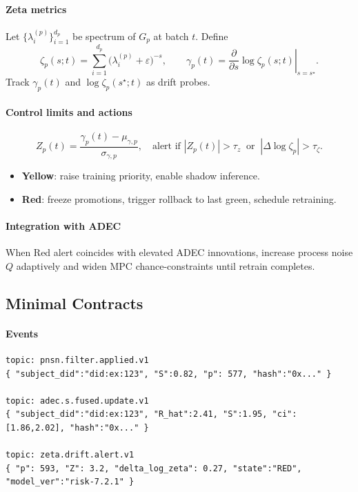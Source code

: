 \documentclass[11pt]{article}
\theoremstyle{plain}
\begin{document}
\paragraph{Zeta metrics}
Let $\{\lambda^{(p)}_i\}_{i=1}^{d_p}$ be spectrum of $G_p$ at batch $t$. Define
\[
\zeta_p(s;t) = \sum_{i=1}^{d_p}\big(\lambda^{(p)}_i+\varepsilon\big)^{-s},\qquad
\gamma_p(t)=\left.\frac{\partial}{\partial s}\log\zeta_p(s;t)\right|_{s=s^\star}.
\]
Track $\gamma_p(t)$ and $\log\zeta_p(s^\star;t)$ as drift probes.

\paragraph{Control limits and actions}
\[
Z_p(t) = \frac{\gamma_p(t)-\mu_{\gamma,p}}{\sigma_{\gamma,p}},\quad
\text{alert if } |Z_p(t)|>\tau_z \ \text{ or } \ |\Delta\log\zeta_p|>\tau_\zeta.
\]
\begin{itemize}
  \item \textbf{Yellow}: raise training priority, enable shadow inference.
  \item \textbf{Red}: freeze promotions, trigger rollback to last green, schedule retraining.
\end{itemize}

\paragraph{Integration with ADEC}
When Red alert coincides with elevated ADEC innovations, increase process noise $Q$ adaptively and widen MPC chance-constraints until retrain completes.

\subsection{Minimal Contracts}
\paragraph{Events}
\begin{verbatim}
topic: pnsn.filter.applied.v1
{ "subject_did":"did:ex:123", "S":0.82, "p": 577, "hash":"0x..." }

topic: adec.s.fused.update.v1
{ "subject_did":"did:ex:123", "R_hat":2.41, "S":1.95, "ci":[1.86,2.02], "hash":"0x..." }

topic: zeta.drift.alert.v1
{ "p": 593, "Z": 3.2, "delta_log_zeta": 0.27, "state":"RED", "model_ver":"risk-7.2.1" }
\end{verbatim}
\end{document}
